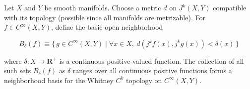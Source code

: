 Let $X$ and $Y$ be smooth manifolds. Choose a metric $d$ on $J^k(X, Y)$ compatible with its topology (possible since all manifolds are metrizable). For $f \in C^\infty(X, Y)$, define the basic open neighborhood

$$B_\delta(f) \equiv \{\, g \in C^\infty(X, Y) \mid \forall x \in X,\ d(j^k f(x), j^k g(x)) < \delta(x) \,\}$$

where $\delta: X \to \mathbf{R}^+$ is a continuous positive-valued function. The collection of all such sets $B_\delta(f)$ as $\delta$ ranges over all continuous positive functions forms a neighborhood basis for the Whitney $C^k$ topology on $C^\infty(X, Y)$.
